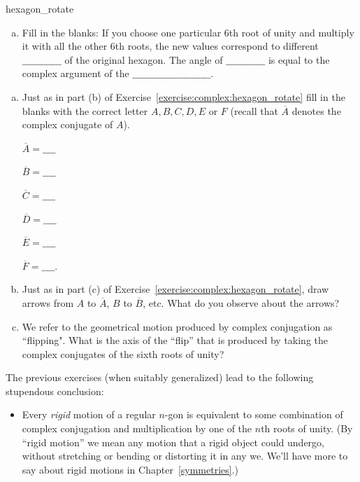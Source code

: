 {\begin{exercise}{hexagon_rotate}
\begin{enumerate}[(a)]
\item
Fill in the blanks:  If you choose one particular 6th root of unity and multiply it with all the other 6th roots, the new values correspond to different $\_\_\_\_\_\_\_\_\_\_\_\_$ of the original hexagon. The angle of $\_\_\_\_\_\_\_\_\_\_\_\_$ is equal to the complex argument of the $\_\_\_\_\_\_\_\_\_\_\_\_\_\_\_\_\_\_\_\_\_\_\_\_$.
\end{enumerate}
\end{exercise}

\begin{exercise}{55}
\begin{enumerate}[(a)]
\item
Just as in part (b) of Exercise~\ref{exercise:complex:hexagon_rotate} fill in the blanks with the correct letter $A,B,C,D,E$ or $F$ (recall that $\overline{A}$ denotes the complex conjugate of $A$).
\begin{multicols}{3}
$ \overline{A} = \_\_\_\_ $

$  \overline{B} = \_\_\_\_ $

$  \overline{C} = \_\_\_\_ $

 $ \overline{D} = \_\_\_\_ $

$ \overline{E} = \_\_\_\_ $

 $ \overline{F} = \_\_\_\_.  $
\end{multicols}
\item 
Just as in part (c) of Exercise~\ref{exercise:complex:hexagon_rotate}, draw arrows from $A$ to $\overline{A}$, $B$ to $\overline{B}$, etc. What do you observe about the arrows?

\item We refer to the geometrical motion produced by complex conjugation as ``flipping". What is the axis of the ``flip'' that is produced by taking the complex conjugates of the sixth roots of unity?
\end{enumerate}
\end{exercise}

The previous exercises (when suitably generalized) lead to the following stupendous conclusion:

\begin{itemize}
\item
Every \emph{rigid} motion of a regular $n$-gon is equivalent to some combination of complex conjugation and multiplication by one of the $n$th roots of unity. (By ``rigid motion'' we mean any motion that a rigid object could undergo, without stretching or bending or distorting it in any we. We'll have more to say about rigid motions in Chapter~\ref{symmetries}.) 
\end{itemize}

}
